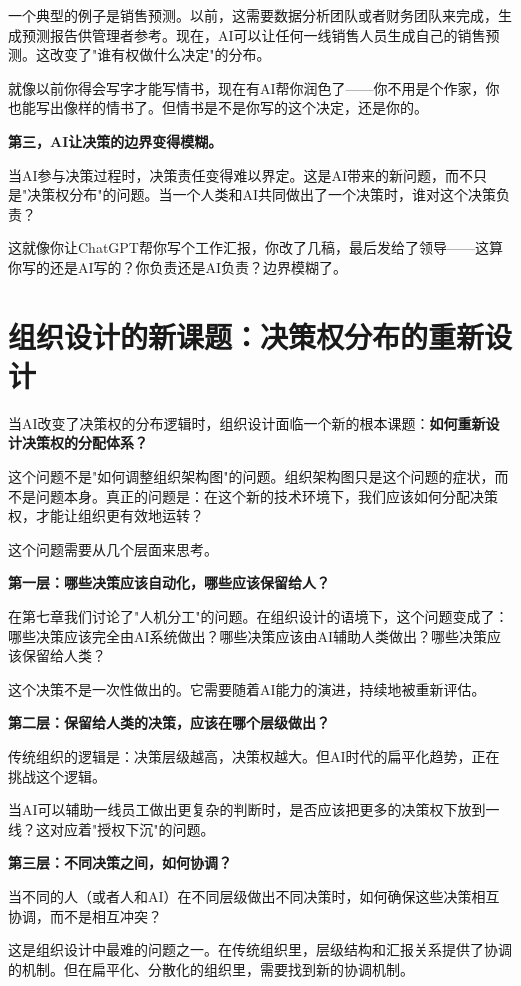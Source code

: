 一个典型的例子是销售预测。以前，这需要数据分析团队或者财务团队来完成，生成预测报告供管理者参考。现在，AI可以让任何一线销售人员生成自己的销售预测。这改变了"谁有权做什么决定"的分布。

就像以前你得会写字才能写情书，现在有AI帮你润色了——你不用是个作家，你也能写出像样的情书了。但情书是不是你写的这个决定，还是你的。

\textbf{第三，AI让决策的边界变得模糊。}

当AI参与决策过程时，决策责任变得难以界定。这是AI带来的新问题，而不只是"决策权分布"的问题。当一个人类和AI共同做出了一个决策时，谁对这个决策负责？

这就像你让ChatGPT帮你写个工作汇报，你改了几稿，最后发给了领导——这算你写的还是AI写的？你负责还是AI负责？边界模糊了。

\section{组织设计的新课题：决策权分布的重新设计}


当AI改变了决策权的分布逻辑时，组织设计面临一个新的根本课题：\textbf{如何重新设计决策权的分配体系？}

这个问题不是"如何调整组织架构图"的问题。组织架构图只是这个问题的症状，而不是问题本身。真正的问题是：在这个新的技术环境下，我们应该如何分配决策权，才能让组织更有效地运转？

这个问题需要从几个层面来思考。

\textbf{第一层：哪些决策应该自动化，哪些应该保留给人？}

在第七章我们讨论了"人机分工"的问题。在组织设计的语境下，这个问题变成了：哪些决策应该完全由AI系统做出？哪些决策应该由AI辅助人类做出？哪些决策应该保留给人类？

这个决策不是一次性做出的。它需要随着AI能力的演进，持续地被重新评估。

\textbf{第二层：保留给人类的决策，应该在哪个层级做出？}

传统组织的逻辑是：决策层级越高，决策权越大。但AI时代的扁平化趋势，正在挑战这个逻辑。

当AI可以辅助一线员工做出更复杂的判断时，是否应该把更多的决策权下放到一线？这对应着"授权下沉"的问题。

\textbf{第三层：不同决策之间，如何协调？}

当不同的人（或者人和AI）在不同层级做出不同决策时，如何确保这些决策相互协调，而不是相互冲突？

这是组织设计中最难的问题之一。在传统组织里，层级结构和汇报关系提供了协调的机制。但在扁平化、分散化的组织里，需要找到新的协调机制。

